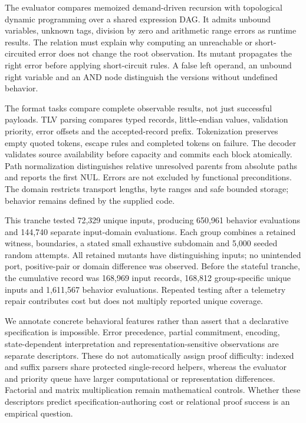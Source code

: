 \documentclass{article}
\begin{document}
The evaluator compares memoized demand-driven recursion with topological dynamic programming over a shared expression DAG. It admits unbound variables, unknown tags, division by zero and arithmetic range errors as runtime results. The relation must explain why computing an unreachable or short-circuited error does not change the root observation. Its mutant propagates the right error before applying short-circuit rules. A false left operand, an unbound right variable and an AND node distinguish the versions without undefined behavior.

The format tasks compare complete observable results, not just successful payloads. TLV parsing compares typed records, little-endian values, validation priority, error offsets and the accepted-record prefix. Tokenization preserves empty quoted tokens, escape rules and completed tokens on failure. The decoder validates source availability before capacity and commits each block atomically. Path normalization distinguishes relative unresolved parents from absolute paths and reports the first NUL. Errors are not excluded by functional preconditions. The domain restricts transport lengths, byte ranges and safe bounded storage; behavior remains defined by the supplied code.

This tranche tested 72,329 unique inputs, producing 650,961 behavior evaluations and 144,740 separate input-domain evaluations. Each group combines a retained witness, boundaries, a stated small exhaustive subdomain and 5,000 seeded random attempts. All retained mutants have distinguishing inputs; no unintended port, positive-pair or domain difference was observed. Before the stateful tranche, the cumulative record was 168,969 input records, 168,812 group-specific unique inputs and 1,611,567 behavior evaluations. Repeated testing after a telemetry repair contributes cost but does not multiply reported unique coverage.

We annotate concrete behavioral features rather than assert that a declarative specification is impossible. Error precedence, partial commitment, encoding, state-dependent interpretation and representation-sensitive observations are separate descriptors. These do not automatically assign proof difficulty: indexed and suffix parsers share protected single-record helpers, whereas the evaluator and priority queue have larger computational or representation differences. Factorial and matrix multiplication remain mathematical controls. Whether these descriptors predict specification-authoring cost or relational proof success is an empirical question.
\end{document}
